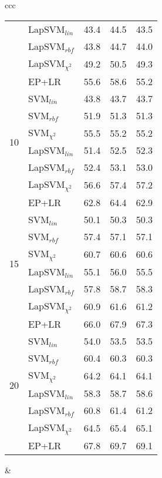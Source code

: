 \documentclass[journal,11pt]{IEEEtran}
\begin{document}
\begin{center}
{\begin{tabular}{ccc}
\begin{tabular}{|r|l|rrr|}
& LapSVM$_{lin}$ 	 	& 43.4 & 44.5 & 43.5 \\
& LapSVM$_{rbf}$ 	 	& 43.8 & 44.7 & 44.0 \\
& LapSVM$_{\chi^2}$ & 49.2 & 50.5 & 49.3 \\
& EP+LR							& 55.6 & 58.6 & 55.2 \\
\hline
\multirow{6}{*}{10}
& SVM$_{lin}$ 	 		& 43.8 & 43.7 & 43.7 \\
& SVM$_{rbf}$ 	 		& 51.9 & 51.3 & 51.3 \\
& SVM$_{\chi^2}$ 		& 55.5 & 55.2 & 55.2 \\
& LapSVM$_{lin}$ 	 	& 51.4 & 52.5 & 52.3 \\
& LapSVM$_{rbf}$ 	 	& 52.4 & 53.1 & 53.0 \\ 
& LapSVM$_{\chi^2}$ & 56.6 & 57.4 & 57.2 \\
& EP+LR							& 62.8 & 64.4 & 62.9 \\
\hline
\multirow{6}{*}{15}
& SVM$_{lin}$ 	 		& 50.1 & 50.3 & 50.3 \\
& SVM$_{rbf}$ 	 		& 57.4 & 57.1 & 57.1 \\
& SVM$_{\chi^2}$ 		& 60.7 & 60.6 & 60.6 \\
& LapSVM$_{lin}$ 	 	& 55.1 & 56.0 & 55.5 \\
& LapSVM$_{rbf}$ 	 	& 57.8 & 58.7 & 58.3 \\ 
& LapSVM$_{\chi^2}$ & 60.9 & 61.6 & 61.2 \\
& EP+LR							& 66.0 & 67.9 & 67.3 \\
\hline
\multirow{6}{*}{20}
& SVM$_{lin}$ 	 		& 54.0 & 53.5 & 53.5 \\
& SVM$_{rbf}$ 	 		& 60.4 & 60.3 & 60.3 \\
& SVM$_{\chi^2}$ 		& 64.2 & 64.1 & 64.1 \\
& LapSVM$_{lin}$ 	 	& 58.3 & 58.7 & 58.6 \\
& LapSVM$_{rbf}$ 	 	& 60.8 & 61.4 & 61.2 \\ 
& LapSVM$_{\chi^2}$ & 64.5 & 65.4 & 65.1 \\ 
& EP+LR							& 67.8 & 69.7 & 69.1 \\
\hline
\end{tabular}

&


\end{tabular}}
\end{center}
\end{document}
